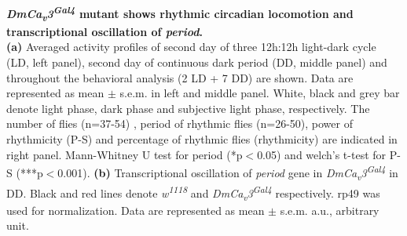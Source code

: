 \label{fig:4}
\textbf{ \emph{DmCa\textsubscript{v}3\textsuperscript{Gal4}} mutant shows rhythmic circadian locomotion and transcriptional oscillation of \emph{period}.}
\\
\textbf{(a)} Averaged activity profiles of second day of three 12h:12h light-dark cycle (LD, left panel), second day of continuous dark period (DD, middle panel) and throughout the behavioral analysis (2 LD + 7 DD) are shown.
Data are represented as mean $\pm$ s.e.m. in left and middle panel.
White, black and grey bar denote light phase, dark phase and subjective light phase, respectively.
The number of flies (n=37-54) , period of rhythmic flies (n=26-50), power of rhythmicity (P-S) and percentage of rhythmic flies (rhythmicity) are indicated in right panel.
Mann-Whitney U test for period (*p$<$0.05) and welch's t-test for P-S (***p$<$0.001). 
\textbf{(b)} Transcriptional oscillation of \emph{period} gene in  \emph{DmCa\textsubscript{v}3\textsuperscript{Gal4}} in DD. Black and red lines denote \emph{w\textsuperscript{1118}} and \emph{DmCa\textsubscript{v}3\textsuperscript{Gal4}} respectively. rp49 was used for normalization.
Data are represented as mean $\pm$ s.e.m.
a.u., arbitrary unit.
  
  
  
  
  
  
  
  
  